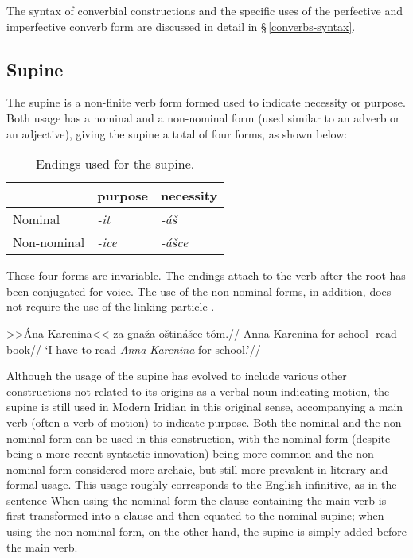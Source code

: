 The syntax of converbial constructions and the specific uses of the perfective and imperfective converb form are discussed in detail in \S\,\ref{converbs-syntax}.


\subsection{Supine}

The {\sc supine} is a non-finite verb form formed used to indicate necessity or purpose. Both usage has a nominal and a non-nominal form (used similar to an adverb or an adjective), giving the supine a total of four forms, as shown below:

\begin{table}[h!]
	\small
	\caption{Endings used for the supine.}
	\medskip
	\begin{tabu} to 0.6\textwidth{YYY}
		\toprule
		&{\sc purpose}&{\sc necessity}\\
		\midrule
		Nominal & \textit{-it} & \textit{-áš}\\
		Non-nominal & \textit{-ice} & \textit{-ášce}\\
		\bottomrule
	\end{tabu}
\end{table}

These four forms are invariable. The endings attach to the verb after the root has been conjugated for voice. The use of the non-nominal forms, in addition, does not require the use of the linking particle .

\pex
\begingl
\gla >>Ána Karenina<< za gnaža oštinášce tóm.//
\glb Anna Karenina for school-\Acc{} read-\Pv{}-\SupN{} book//
\glft `I have to read \textit{Anna Karenina} for school.'//
\endgl
\xe

Although the usage of the supine has evolved to include various other constructions not related to its origins as a verbal noun indicating motion, the supine is still used in Modern Iridian in this original sense, accompanying a main verb (often a verb of motion) to indicate purpose. Both the nominal and the non-nominal form can be used in this construction, with the nominal form (despite being a more recent syntactic innovation) being more common and the non-nominal form considered more archaic, but still more prevalent in literary and formal usage. This usage roughly corresponds to the English infinitive, as in the sentence  When using the nominal form the clause containing the main verb is first transformed into a clause and then equated to the nominal supine; when using the non-nominal form, on the other hand, the supine is simply added before the main verb.

